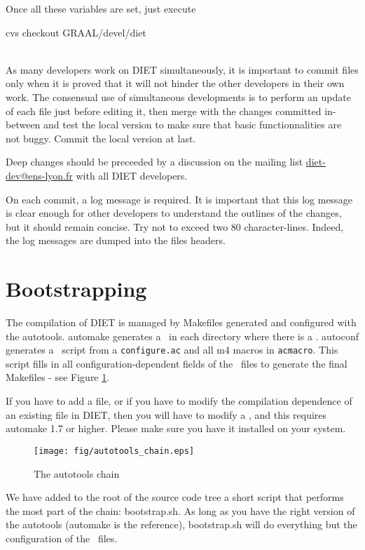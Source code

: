 Once all these variables are set, just execute\\
\centerline{\sf cvs checkout GRAAL/devel/diet}\\


As many developers work on DIET simultaneously, it is important to
commit files only when it is proved that it will not hinder the other
developers in their own work. The consensual use of simultaneous
developments is to perform an update of each file just before editing
it, then merge with the changes committed in-between and test the
local version to make sure that basic functionnalities are not
buggy. Commit the local version at last.

Deep changes should be preceeded by a discussion on the mailing list
\url{diet-dev@ens-lyon.fr} with all DIET developers.

On each commit, a log message is required. It is important that this
log message is clear enough for other developers to understand the
outlines of the changes, but it should remain concise. Try not to
exceed two 80 character-lines.  Indeed, the log messages are dumped
into the files headers.


\section{Bootstrapping}

The compilation of DIET is managed by Makefiles generated and
configured with the autotools. \textsf{automake} generates a \makein\
in each directory where there is a \makeam. \textsf{autoconf}
generates a \configure\ script from a \texttt{configure.ac} and all m4
macros in \texttt{acmacro}. This script fills in all
configuration-dependent fields of the \makein\ files to generate the
final Makefiles - see Figure \ref{fig:autochain}.

If you have to add a file, or if you have to modify the compilation
dependence of an existing file in DIET, then you will have to modify a
\makeam, and this requires \textsf{automake 1.7} or higher. Please
make sure you have it installed on your system.


\begin{figure}[hbt]
\begin{center}
\texttt{[image: fig/autotools\_chain.eps]}
\end{center}
\caption{The autotools chain}\label{fig:autochain}
\end{figure}

We have added to the root of the source code tree a short script that
performs the most part of the chain: \textsf{bootstrap.sh}. As long as
you have the right version of the autotools (\textsf{automake} is the
reference), \textsf{bootstrap.sh} will do everything but the
configuration of the \makein\ files.\\

